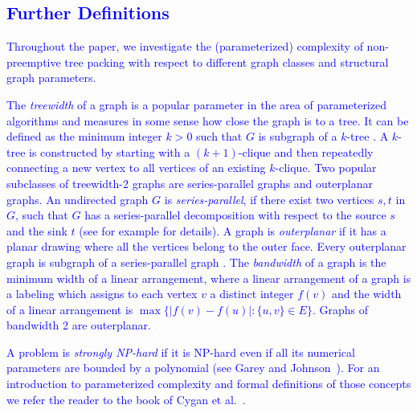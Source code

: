 \documentclass[runningheads]{llncs}
\newcommand{\NN}{\mathbb{N}}
\newcommand{\set}[1]{\{ #1 \}}
\newcommand{\lasse}[1]{\textcolor{blue}{#1}}
\begin{document}



\subsection{\lasse{Further Definitions}}

\lasse{Throughout the paper, we investigate the (parameterized) complexity of non-preemptive tree packing 
with respect to different graph classes and structural graph parameters.}

\lasse{The \emph{treewidth} of a graph is a popular parameter in the area of parameterized algorithms and measures in some sense how close the graph is to a tree. It can be defined as the minimum integer $k > 0$ such that $G$ is subgraph of a $k$-tree \cite{bodlaender1998partial}. A $k$-tree is constructed by starting with a $(k +1)$-clique and then repeatedly
connecting a new vertex to all vertices of an existing $k$-clique.
Two popular subclasses of treewidth-2 graphs are series-parallel graphs and outerplanar graphs. An undirected graph $G$ is \emph{series-parallel}, if there exist two vertices $s,t$ in $G$, such that $G$ has a series-parallel decomposition with respect to the source $s$ and the sink $t$ (see for example \cite[p. 22]{bodlaender1998partial} for details).  A graph is \emph{outerplanar} if it has a planar drawing where all the vertices belong to the outer face. Every outerplanar graph is subgraph of a series-parallel graph  \cite{bodlaender1998partial}.
The \emph{bandwidth} of a graph is the minimum width of a linear arrangement, where a linear arrangement of a graph is a labeling which assigns to each vertex $v$ a distinct integer $f(v)$ and the width of a linear arrangement is $\max\set{|f(v)-f(u)| : \set{u,v} \in E}$. Graphs of bandwidth 2 are outerplanar.}

\lasse{A problem is \emph{strongly NP-hard} if it is NP-hard even if all its numerical parameters are bounded by a polynomial (see Garey and Johnson~\cite{garey1979computers}).
For an introduction to parameterized complexity and formal definitions of those concepts 
we refer the reader to the book of Cygan et al.~\cite{cygan2015parameterized}.}
\end{document}
